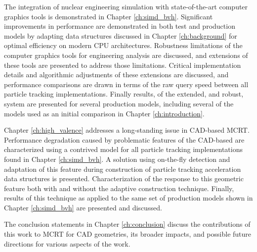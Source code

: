 The integration of nuclear engineering simulation with state-of-the-art
computer graphics tools is demonstrated in Chapter \ref{ch:simd_bvh}. Significant
improvements in performance are demonstrated in both test and production models
by adapting data structures discussed in Chapter \ref{ch:background} for optimal
efficiency on modern CPU architectures. Robustness limitations of the computer graphics
tools for engineering analysis are discussed, and extensions of these tools are
presented to address those limitations. Critical implementation details and
algorithmic adjustments of these
extensions are discussed, and performance comparisons are drawn in terms of the
raw query speed between all particle tracking implementations. Finally results,
of the extended, and robust, system are presented for several production models,
including several of the models used as an initial comparison in Chapter
\ref{ch:introduction}.

Chapter \ref{ch:high_valence} addresses a long-standing issue in CAD-based
MCRT. Performance degradation caused by problematic features of the CAD-based
are characterized using a contrived model for all particle tracking
implementations found in Chapter \ref{ch:simd_bvh}. A solution using on-the-fly
detection and adaptation of this feature during construction of particle tracking
acceleration data structures is presented. Characterization of the response to
this geometric feature both with and without the adaptive construction
technique. Finally, results of this technique as applied to the same set of
production models shown in Chapter \ref{ch:simd_bvh} are presented and discussed.

The conclusion statements in Chapter \ref{ch:conclusion} discuss the
contributions of this work to MCRT for CAD geometries, its broader impacts, and
possible future directions for various aspects of the work.
